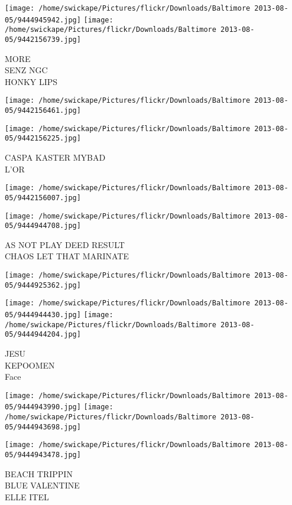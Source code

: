 \documentclass[10pt,letterpaper]{article}
\begin{document}
\vspace{0.25in}
\texttt{[image: /home/swickape/Pictures/flickr/Downloads/Baltimore 2013-08-05/9444945942.jpg]}
\texttt{[image: /home/swickape/Pictures/flickr/Downloads/Baltimore 2013-08-05/9442156739.jpg]}

MORE\\
SENZ NGC\\
HONKY LIPS
\pagebreak

\texttt{[image: /home/swickape/Pictures/flickr/Downloads/Baltimore 2013-08-05/9442156461.jpg]}

\vspace{0.25in}
\texttt{[image: /home/swickape/Pictures/flickr/Downloads/Baltimore 2013-08-05/9442156225.jpg]}

CASPA KASTER MYBAD\\
L'OR
\pagebreak

\texttt{[image: /home/swickape/Pictures/flickr/Downloads/Baltimore 2013-08-05/9442156007.jpg]}

\vspace{0.25in}
\texttt{[image: /home/swickape/Pictures/flickr/Downloads/Baltimore 2013-08-05/9444944708.jpg]}

AS NOT PLAY DEED RESULT\\
CHAOS LET THAT MARINATE
\pagebreak

\texttt{[image: /home/swickape/Pictures/flickr/Downloads/Baltimore 2013-08-05/9444925362.jpg]}

\vspace{0.25in}
\texttt{[image: /home/swickape/Pictures/flickr/Downloads/Baltimore 2013-08-05/9444944430.jpg]}
\texttt{[image: /home/swickape/Pictures/flickr/Downloads/Baltimore 2013-08-05/9444944204.jpg]}

JESU\\
KEPOOMEN\\
Face
\pagebreak

\texttt{[image: /home/swickape/Pictures/flickr/Downloads/Baltimore 2013-08-05/9444943990.jpg]}
\texttt{[image: /home/swickape/Pictures/flickr/Downloads/Baltimore 2013-08-05/9444943698.jpg]}

\vspace{0.25in}
\texttt{[image: /home/swickape/Pictures/flickr/Downloads/Baltimore 2013-08-05/9444943478.jpg]}

BEACH TRIPPIN\\
BLUE VALENTINE\\
ELLE ITEL
\pagebreak
\end{document}
